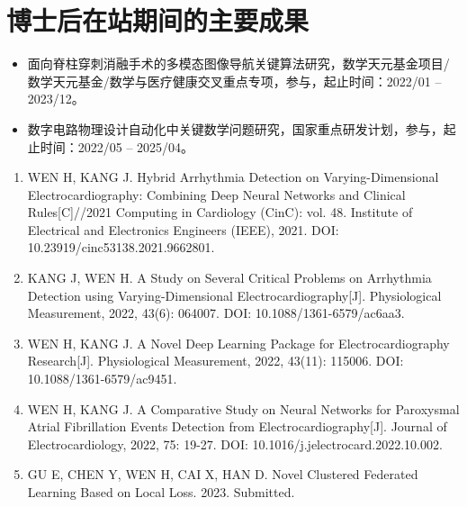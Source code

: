 \chapter*{博士后在站期间的主要成果}
\headheight=15.24pt%


\begin{itemize}
    \item 面向脊柱穿刺消融手术的多模态图像导航关键算法研究，数学天元基金项目/数学天元基金/数学与医疗健康交叉重点专项，参与，起止时间：2022/01 -- 2023/12。
    \item 数字电路物理设计自动化中关键数学问题研究，国家重点研发计划，参与，起止时间：2022/05 -- 2025/04。
\end{itemize}


\begin{enumerate}
    \item WEN H, KANG J. Hybrid Arrhythmia Detection on Varying-Dimensional Electrocardiography: Combining Deep Neural Networks and Clinical Rules[C]//2021 Computing in Cardiology (CinC): vol. 48. Institute of Electrical and Electronics Engineers (IEEE), 2021. DOI: 10.23919/cinc53138.2021.9662801.
    \item KANG J, WEN H. A Study on Several Critical Problems on Arrhythmia Detection using Varying-Dimensional Electrocardiography[J]. Physiological Measurement, 2022, 43(6): 064007. DOI: 10.1088/1361-6579/ac6aa3.
    \item WEN H, KANG J. A Novel Deep Learning Package for Electrocardiography Research[J]. Physiological Measurement, 2022, 43(11): 115006. DOI: 10.1088/1361-6579/ac9451.
    \item WEN H, KANG J. A Comparative Study on Neural Networks for Paroxysmal Atrial Fibrillation Events Detection from Electrocardiography[J]. Journal of Electrocardiology, 2022, 75: 19-27. DOI: 10.1016/j.jelectrocard.2022.10.002.
    \item GU E, CHEN Y, WEN H, CAI X, HAN D. Novel Clustered Federated Learning Based on Local Loss. 2023. Submitted.
\end{enumerate}


